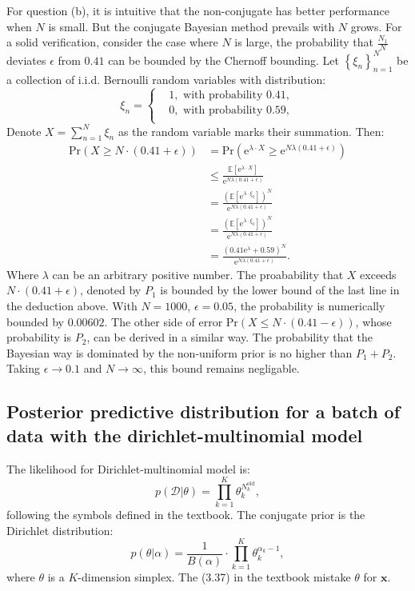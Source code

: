 \documentclass[UTF8]{ctexart}
\begin{document}
For question (b), it is intuitive that the non-conjugate has better performance when $N$ is small.
But the conjugate Bayesian method prevails with $N$ grows.
For a solid verification, consider the case where $N$ is large, the probability that $\frac{N_{1}}{N}$ deviates $\epsilon$ from $0.41$ can be bounded by the Chernoff bounding.
Let $\left\{\xi_{n}\right\}_{n=1}^{N}$ be a collection of i.i.d. Bernoulli random variables with distribution:
$$
\xi_{n}=\left\{
\begin{aligned}
&1,\text{ with probability 0.41},\\
&0,\text{ with probability 0.59},\\
\end{aligned}
\right.
$$
Denote $X=\sum_{n=1}^{N}\xi_{n}$ as the random variable marks their summation.
Then:
$$
\begin{aligned}
\text{Pr}(X\geq N\cdot(0.41+\epsilon))&=\text{Pr}(\text{e}^{\lambda\cdot X}\geq \text{e}^{N\lambda(0.41+\epsilon)})\\
&\leq \frac{\mathbb{E}[\text{e}^{\lambda\cdot X}]}{\text{e}^{N\lambda(0.41+\epsilon)}}\\
&=\frac{\left(\mathbb{E}[\text{e}^{\lambda\cdot\xi_{0}}]\right)^{N}}{\text{e}^{N\lambda(0.41+\epsilon)}}\\
&=\frac{\left(\mathbb{E}[\text{e}^{\lambda\cdot\xi_{0}}]\right)^{N}}{\text{e}^{N\lambda(0.41+\epsilon)}}\\
&=\frac{\left(0.41\text{e}^{\lambda}+0.59\right)^{N}}{\text{e}^{N\lambda(0.41+\epsilon)}}.
\end{aligned}
$$
Where $\lambda$ can be an arbitrary positive number.
The proabability that $X$ exceeds $N\cdot(0.41+\epsilon)$, denoted by $P_{1}$ is bounded by the lower bound of the last line in the deduction above.
With $N=1000$, $\epsilon=0.05$, the probability is numerically bounded by $0.00602$.
The other side of error $\text{Pr}(X\leq N\cdot(0.41-\epsilon))$, whose probability is $P_{2}$, can be derived in a similar way.
The probability that the Bayesian way is dominated by the non-uniform prior is no higher than $P_{1}+P_{2}$.
Taking $\epsilon\rightarrow 0.1$ and $N\rightarrow \infty$, this bound remains negligable.



\subsection{Posterior predictive distribution for a batch of data with the dirichlet-multinomial model}
The likelihood for Dirichlet-multinomial model is:
$$p(\mathcal{D}|\theta)=\prod_{k=1}^{K}\theta_{k}^{N_{k}^{\text{old}}},$$
following the symbols defined in the textbook.
The conjugate prior is the Dirichlet distribution:
$$p(\theta|\alpha)=\frac{1}{B(\alpha)}\cdot\prod_{k=1}^{K}\theta_{k}^{\alpha_{k}-1},$$
where $\theta$ is a $K$-dimension simplex.
The (3.37) in the textbook mistake $\theta$ for $\textbf{x}$.
\end{document}
